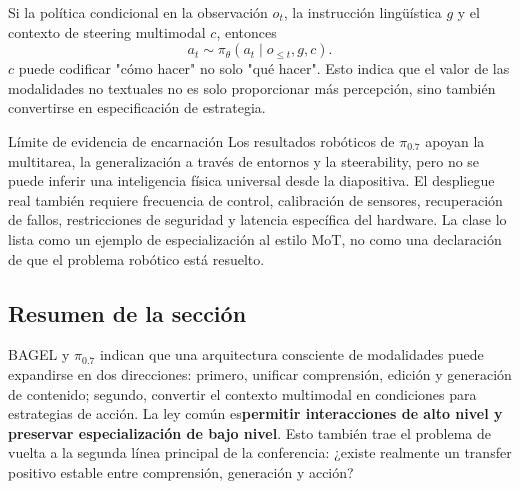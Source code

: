 Si la política condicional en la observación $o_t$, la instrucción lingüística $g$ y el contexto de steering multimodal $c$, entonces
$$
a_t\sim\pi_\theta(a_t\mid o_{\le t},g,c).
$$
$c$ puede codificar "cómo hacer" no solo "qué hacer". Esto indica que el valor de las modalidades no textuales no es solo proporcionar más percepción, sino también convertirse en especificación de estrategia.

\begin{warningbox}{Límite de evidencia de encarnación}
Los resultados robóticos de $\pi_{0.7}$ apoyan la multitarea, la generalización a través de entornos y la steerability, pero no se puede inferir una inteligencia física universal desde la diapositiva. El despliegue real también requiere frecuencia de control, calibración de sensores, recuperación de fallos, restricciones de seguridad y latencia específica del hardware. La clase lo lista como un ejemplo de especialización al estilo MoT, no como una declaración de que el problema robótico está resuelto.
\end{warningbox}

\subsection{Resumen de la sección}

BAGEL y $\pi_{0.7}$ indican que una arquitectura consciente de modalidades puede expandirse en dos direcciones: primero, unificar comprensión, edición y generación de contenido; segundo, convertir el contexto multimodal en condiciones para estrategias de acción. La ley común es\textbf{permitir interacciones de alto nivel y preservar especialización de bajo nivel}. Esto también trae el problema de vuelta a la segunda línea principal de la conferencia: ¿existe realmente un transfer positivo estable entre comprensión, generación y acción?
